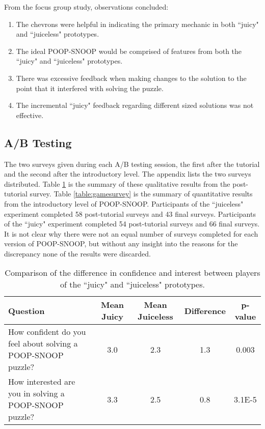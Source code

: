From the focus group study, observations concluded: 

\begin{enumerate}

\item The chevrons were helpful in indicating the primary mechanic in both ``juicy" and ``juiceless" prototypes.

\item The ideal POOP-SNOOP would be comprised of features from both the ``juicy" and ``juiceless" prototypes.

\item There was excessive feedback when making changes to the solution to the point that it interfered with solving the puzzle.

\item The incremental ``juicy" feedback regarding different sized solutions was not effective.

\end{enumerate}

\subsection{A/B Testing}

The two surveys given during each A/B testing session, the first after the tutorial and the second after the introductory level. The appendix lists the two surveys distributed. Table \ref{table:tutorialsurvey} is the summary of these qualitative results from the post-tutorial survey. Table \ref{table:gamesurvey} is the summary of quantitative results from the introductory level of POOP-SNOOP. Participants of the ``juiceless" experiment completed 58 post-tutorial surveys and 43 final surveys. Participants of the ``juicy" experiment completed 54 post-tutorial surveys and 66 final surveys. It is not clear why there were not an equal number of surveys completed for each version of POOP-SNOOP, but without any insight into the reasons for the discrepancy none of the results were discarded.


\begin{table}
\begin{center}

\begin{tabular}{|>{\centering}p{3cm}|c|c|c||c|}
\hline 
Question&  Mean Juicy&  Mean Juiceless&  Difference&  p-value
\tabularnewline
\hline 
How confident do you feel about solving a POOP-SNOOP puzzle?&  3.0&  2.3&  1.3&  0.003
\tabularnewline
\hline 
How interested are you in solving a POOP-SNOOP puzzle?&  3.3&  2.5&  0.8&  3.1E-5 
\tabularnewline
\hline 
\end{tabular}

\caption[Post-tutorial survey results]{Comparison of the difference in confidence and interest between players of the ``juicy" and ``juiceless" prototypes.}
\label{table:tutorialsurvey}
\end{center}
\end{table}

